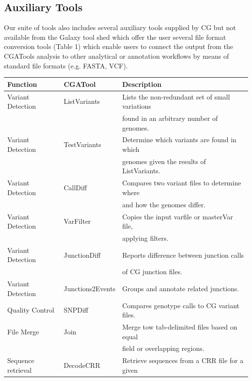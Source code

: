 \subsection*{Auxiliary Tools}

Our suite of tools also includes several auxiliary tools supplied by CG but not available from the Galaxy tool shed which offer the user several file format conversion tools (Table 1) which enable users to connect the output from the CGATools analysis to other analytical or annotation workflows by means of standard file formats (e.g. FASTA, VCF).

\begin{table}
\small
\begin{tabular}{l|l|l}
\textbf{Function} & \textbf{CGATool}  & \textbf{Description} \\ \hline
Variant Detection & ListVariants & Lists the non-redundant set of small variations  \\
                  &              & found in an arbitrary number of genomes. \\ \hline
Variant Detection & TestVariants & Determine which variants are found in which   \\
                  &              & genomes given the results of ListVariants. \\ \hline
Variant Detection & CallDiff     & Compares two variant files to determine where \\
                  &              & and how the genomes differ. \\ \hline
Variant Detection & VarFilter    & Copies the input varfile or masterVar file, \\
                  &              & applying filters. \\ \hline
Variant Detection & JunctionDiff & Reports difference between junction calls \\
                  &              & of CG junction files. \\ \hline
Variant Detection & Junctions2Events & Groups and annotate related junctions. \\ \hline
Quality Control   & SNPDiff      & Compares genotype calls to CG variant files. \\ \hline
File Merge        & Join         & Merge tow tab-delimited files based on equal \\
                  &              & field or overlapping regions. \\ \hline
Sequence retrieval& DecodeCRR    & Retrieve sequences from a CRR file for a given \\

\end{tabular}
\end{table}
